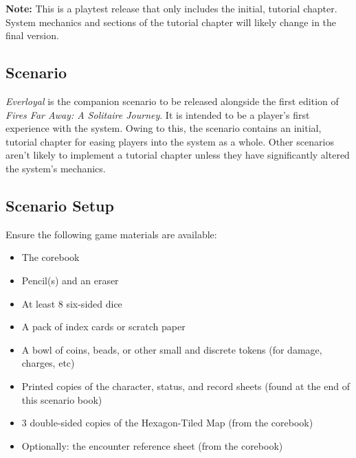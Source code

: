 \documentclass[12pt]{article}
\begin{document}
\vspace*{\fill}

\begin{center}
{\Large \textbf{Note:}
This is a playtest release that only includes the initial, tutorial chapter.\\
System mechanics and sections of the tutorial chapter will likely change in the final version.\\
}
\end{center}

\vspace*{\fill}

\pagebreak

\begin{multicols*}{2}


\section{Scenario}
\emph{Everloyal} is the companion scenario to be released alongside the first edition of \emph{Fires Far Away: A Solitaire Journey}. It is intended to be a player’s first experience with the system. Owing to this, the scenario contains an initial, tutorial chapter for easing players into the system as a whole. Other scenarios aren’t likely to implement a tutorial chapter unless they have significantly altered the system’s mechanics.

\subsection{Scenario Setup}
Ensure the following game materials are available:

\begin{itemize}
\item The corebook
\item Pencil(s) and an eraser
\item At least 8 six-sided dice
\item A pack of index cards or scratch paper
\item A bowl of coins, beads, or other small and discrete tokens (for damage, charges, etc)
\item Printed copies of the character, status, and record sheets (found at the end of this scenario book)
\item 3 double-sided copies of the Hexagon-Tiled Map (from the corebook)
\item Optionally: the encounter reference sheet (from the corebook)
\end{itemize}


\end{multicols*}
\end{document}
